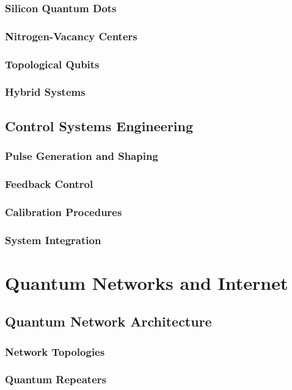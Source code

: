 \documentclass[12pt,a4paper]{book}
\begin{document}
\subsection{Silicon Quantum Dots}
\subsection{Nitrogen-Vacancy Centers}
\subsection{Topological Qubits}
\subsection{Hybrid Systems}

\section{Control Systems Engineering}
\subsection{Pulse Generation and Shaping}
\subsection{Feedback Control}
\subsection{Calibration Procedures}
\subsection{System Integration}

\chapter{Quantum Networks and Internet}

\section{Quantum Network Architecture}
\subsection{Network Topologies}
\subsection{Quantum Repeaters}
\end{document}
